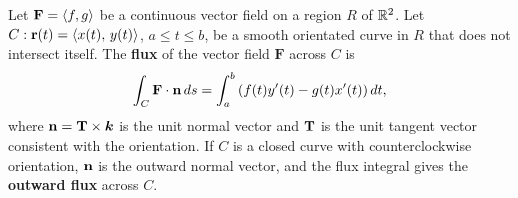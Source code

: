 \documentclass[mathNotesPreamble]{subfiles}
\begin{document}
  \begin{defn*}[Flux]
    Let $\mathbf F={\left\langle f,g \right\rangle}$ be a continuous vector field on a region $R$ of $\mathbb{R}^2$. Let $C: {\mathbf{r}}(t)={\left\langle x(t),\,y(t) \right\rangle}$, $a\leq t\leq b$, be a smooth orientated curve in $R$ that does not intersect itself. The \textbf{flux} of the vector field $\mathbf F$ across $C$ is
      \[\int_C \mathbf F\cdot {\mathbf{n}}\,ds=\int_a^b {\left(f(t)y'(t)-g(t)x'(t)\right)}\,dt,\]
    where ${\mathbf{n}}={\mathbf{T}}\times{\bm{k}}$ is the unit normal vector and ${\mathbf{T}}$ is the unit tangent vector consistent with the orientation. If $C$ is a closed curve with counterclockwise orientation, ${\mathbf{n}}$ is the outward normal vector, and the flux integral gives the \textbf{outward flux} across $C$.
  \end{defn*}

  \pagebreak
  
\end{document}
